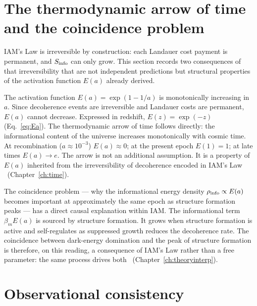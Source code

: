 \section{The thermodynamic arrow of time and the coincidence problem}\label{sec:law_arrow}
IAM's Law is irreversible by construction: each Landauer cost payment is permanent, and $S_{\rm info}$ can only grow. This section records two consequences
of that irreversibility that are not independent predictions but structural properties of the activation function $E(a)$ already derived.

The activation function $E(a)=\exp(1-1/a)$ is monotonically increasing in $a$. Since decoherence events are irreversible and Landauer costs are permanent,
$E(a)$ cannot decrease. Expressed in redshift, $E(z)=\exp(-z)$ (Eq.~\eqref{eq:Ea}). The thermodynamic arrow of time follows directly: the informational
content of the universe increases monotonically with cosmic time. At recombination ($a\approx10^{-3}$) $E(a)\approx0$; at the present epoch $E(1)=1$; at late
times $E(a)\to e$. The arrow is not an additional assumption. It is a property of $E(a)$ inherited from the irreversibility of decoherence encoded in IAM's
Law \interp\ (Chapter~\ref{ch:time}).

The coincidence problem --- why the informational energy density $\rho_{\rm info}\propto E(a)$ becomes important at approximately the same epoch as
structure formation peaks --- has a direct causal explanation within IAM. The informational term $\beta_mE(a)$ is sourced by structure formation. It grows
when structure formation is active and self-regulates as suppressed growth reduces the decoherence rate. The coincidence between dark-energy domination
and the peak of structure formation is therefore, on this reading, a consequence of IAM's Law rather than a free parameter: the same process drives both
\conjecture\ (Chapter~\ref{ch:theoryinterp}).

\section{Observational consistency}
